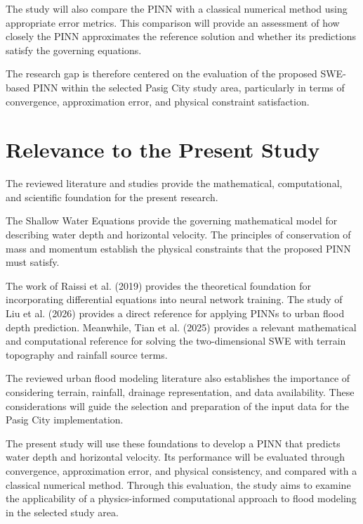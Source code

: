The study will also compare the PINN with a classical numerical method using appropriate error metrics. This comparison will provide an assessment of how closely the PINN approximates the reference solution and whether its predictions satisfy the governing equations.

The research gap is therefore centered on the evaluation of the proposed SWE-based PINN within the selected Pasig City study area, particularly in terms of convergence, approximation error, and physical constraint satisfaction.

\section{Relevance to the Present Study}


The reviewed literature and studies provide the mathematical, computational, and scientific foundation for the present research.

The Shallow Water Equations provide the governing mathematical model for describing water depth and horizontal velocity. The principles of conservation of mass and momentum establish the physical constraints that the proposed PINN must satisfy.

The work of Raissi et al. (2019) provides the theoretical foundation for incorporating differential equations into neural network training. The study of Liu et al. (2026) provides a direct reference for applying PINNs to urban flood depth prediction. Meanwhile, Tian et al. (2025) provides a relevant mathematical and computational reference for solving the two-dimensional SWE with terrain topography and rainfall source terms.

The reviewed urban flood modeling literature also establishes the importance of considering terrain, rainfall, drainage representation, and data availability. These considerations will guide the selection and preparation of the input data for the Pasig City implementation.

The present study will use these foundations to develop a PINN that predicts water depth and horizontal velocity. Its performance will be evaluated through convergence, approximation error, and physical consistency, and compared with a classical numerical method. Through this evaluation, the study aims to examine the applicability of a physics-informed computational approach to flood modeling in the selected study area.

